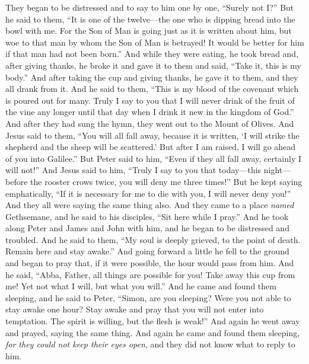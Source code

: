 \begin{biblechapter}
\verse They began to be distressed and to say to him one by one, “Surely not I?”
\verse But he said to them, “It is one of the twelve—the one who is dipping bread into the bowl with me.
\verse For the Son of Man is going just as it is written about him, but woe to that man by whom the Son of Man is betrayed! It would be better for him if that man had not been born.”
 And while they were eating, he took bread and, after giving thanks, he broke it and gave it to them and said, “Take it, this is my body.”
\verse And after taking the cup and giving thanks, he gave it to them, and they all drank from it.
\verse And he said to them, “This is my blood of the covenant which is poured out for many.
\verse Truly I say to you that I will never drink of the fruit of the vine any longer until that day when I drink it new in the kingdom of God.”
\verse And after they had sung the hymn, they went out to the Mount of Olives.
 And Jesus said to them, “You will all fall away, because it is written, ‘I will strike the shepherd 
and the sheep will be scattered.’
\verse But after I am raised, I will go ahead of you into Galilee.”
\verse But Peter said to him, “Even if they all fall away, certainly I will not!”
\verse And Jesus said to him, “Truly I say to you that today—this night—before the rooster crows twice, you will deny me three times!”
\verse But he kept saying emphatically, “If it is necessary for me to die with you, I will never deny you!” And they all were saying the same thing also.
 And they came to a place \textit{named} Gethsemane, and he said to his disciples, “Sit here while I pray.”
\verse And he took along Peter and James and John with him, and he began to be distressed and troubled.
\verse And he said to them, “My soul is deeply grieved, to the point of death. Remain here and stay awake.”
\verse And going forward a little he fell to the ground and began to pray that, if it were possible, the hour would pass from him.
\verse And he said, “Abba, Father, all things are possible for you! Take away this cup from me! Yet not what I will, but what you will.”
\verse And he came and found them sleeping, and he said to Peter, “Simon, are you sleeping? Were you not able to stay awake one hour?
\verse Stay awake and pray that you will not enter into temptation. The spirit is willing, but the flesh is weak!”
\verse And again he went away and prayed, saying the same thing.
\verse And again he came and found them sleeping, \textit{for they could not keep their eyes open}, and they did not know what to reply to him.

\end{biblechapter}
